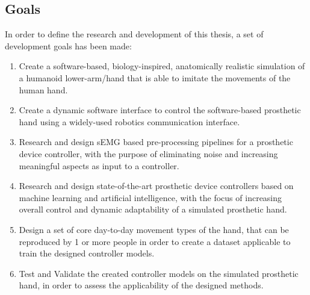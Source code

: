 \documentclass[../main.tex]{subfiles}
\begin{document}
\newpage
\subsection{Goals}
\label{sec:goals}

In order to define the research and development of this thesis, a set of development goals has been made:

\begin{enumerate}
\item Create a software-based, biology-inspired, anatomically realistic simulation of a humanoid lower-arm/hand that is able to imitate the movements of the human hand.
\item Create a dynamic software interface to control the software-based prosthetic hand using a widely-used robotics communication interface.
\item Research and design sEMG based pre-processing pipelines for a prosthetic device controller, with the purpose of eliminating noise and increasing meaningful aspects as input to a controller. 
\item Research and design state-of-the-art prosthetic device controllers based on machine learning and artificial intelligence, with the focus of increasing overall control and dynamic adaptability of a simulated prosthetic hand.
\item Design a set of core day-to-day movement types of the hand, that can be reproduced by 1 or more people in order to create a dataset applicable to train the designed controller models.
\item Test and Validate the created controller models on the simulated prosthetic hand, in order to assess the applicability of the designed methods.
\end{enumerate}
\end{document}
